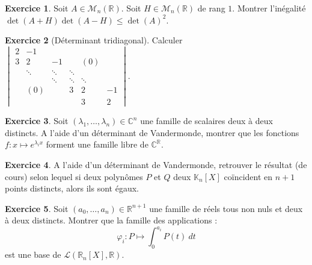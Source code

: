 \documentclass[french]{book}
\newcommand{\R}{\mathbb{R}}
\newcommand{\C}{\mathbb{C}}
\newcommand{\K}{\mathbb{K}}
\theoremstyle{definition}
\newtheorem{ex}{Exercice}[chapter]
\theoremstyle{theorem}
\theoremstyle{remark}
\begin{document}
\begin{ex}
	Soit $A\in\mathcal{M}_n(\R)$. Soit $H\in\mathcal{M}_n(\R)$ de rang $1$. Montrer l'inégalité $\det(A+H)\det(A-H)\leqslant\det(A)^2$.
\end{ex}

\begin{ex}[Déterminant tridiagonal]
	Calculer $\displaystyle\begin{vmatrix}
		2&-1&&&&\\
		3&2&-1&&(0)&\\
		&\ddots&\ddots&\ddots&&\\
		&&\ddots&\ddots&\ddots&\\
		&(0)&&3&2&-1\\
		&&&&3&2
	\end{vmatrix}$.
\end{ex}

\begin{ex}
	Soit $(\lambda_1,\ldots,\lambda_n)\in\C^n$ une famille de scalaires deux à deux distincts. A l'aide d'un déterminant de Vandermonde, montrer que les fonctions $f:x\mapsto e^{\lambda_ix}$ forment une famille libre de $\C^\R$.
\end{ex}

\begin{ex}
	A l'aide d'un déterminant de Vandermonde, retrouver le résultat (de cours) selon lequel si deux polynômes $P$ et $Q$ deux $\K_n[X]$ coïncident en $n+1$ points distincts, alors ils sont égaux.
\end{ex}

\begin{ex}
	Soit $(a_0,\ldots,a_n)\in\R^{n+1}$ une famille de réels tous non nuls et deux à deux distincts. Montrer que la famille des applications : $$\varphi_i:P\mapsto\int_{0}^{a_i}P(t)\ dt$$ est une base de $\mathcal{L}(\R_n[X],\R)$.
\end{ex}
\end{document}
